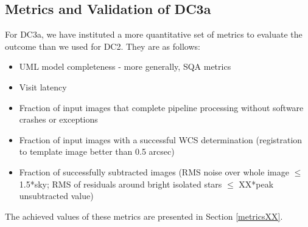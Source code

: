 \subsection{Metrics and Validation of DC3a}

For DC3a, we have instituted a more quantitative set of metrics to
evaluate the outcome than we used for DC2.  They are as follows:

\begin{itemize}
\item UML model completeness - more generally, SQA metrics
\item Visit latency
\item Fraction of input images that complete pipeline processing
  without software crashes or exceptions
\item Fraction of input images with a successful WCS determination
  (registration to template image better than 0.5 arcsec)
\item Fraction of successfully subtracted images (RMS noise over whole
  image $\leq$ 1.5*sky; RMS of residuals around bright isolated stars
  $\leq$ XX*peak unsubtracted value)
\end{itemize}

The achieved values of these metrics are presented in Section \ref{metricsXX}.
